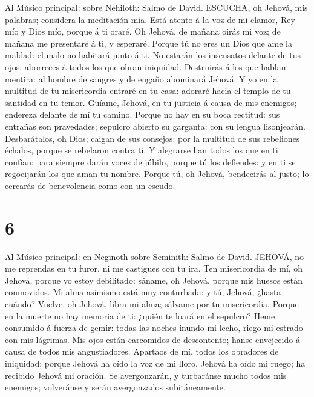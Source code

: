  Al Músico principal: sobre Nehiloth: Salmo de David.
ESCUCHA, oh Jehová, mis palabras; considera la meditación mía.
 Está atento á la voz de mi clamor, Rey mío y Dios mío,
porque á ti oraré.  Oh Jehová, de mañana oirás mi voz; de
mañana me presentaré á ti, y esperaré.  Porque tú no eres un
Dios que ame la maldad: el malo no habitará junto á ti.  No
estarán los insensatos delante de tus ojos: aborreces á todos los que
obran iniquidad.  Destruirás á los que hablan mentira: al
hombre de sangres y de engaño abominará Jehová.  Y yo en la
multitud de tu misericordia entraré en tu casa: adoraré hacia el templo
de tu santidad en tu temor.  Guíame, Jehová, en tu justicia
á causa de mis enemigos; endereza delante de mí tu camino. 
Porque no hay en su boca rectitud: sus entrañas son pravedades; sepulcro
abierto su garganta: con su lengua lisonjearán. 
Desbarátalos, oh Dios; caigan de sus consejos: por la multitud de sus
rebeliones échalos, porque se rebelaron contra ti.  Y
alegrarse han todos los que en ti confían; para siempre darán voces de
júbilo, porque tú los defiendes: y en ti se regocijarán los que aman tu
nombre.  Porque tú, oh Jehová, bendecirás al justo; lo
cercarás de benevolencia como con un escudo.

\hypertarget{section-5}{%
\section{6}\label{section-5}}

 Al Músico principal: en Neginoth sobre Seminith: Salmo de
David. JEHOVÁ, no me reprendas en tu furor, ni me castigues con tu ira.
 Ten misericordia de mí, oh Jehová, porque yo estoy
debilitado: sáname, oh Jehová, porque mis huesos están conmovidos.
 Mi alma asimismo está muy conturbada: y tú, Jehová, ¿hasta
cuándo?  Vuelve, oh Jehová, libra mi alma; sálvame por tu
misericordia.  Porque en la muerte no hay memoria de ti:
¿quién te loará en el sepulcro?  Heme consumido á fuerza de
gemir: todas las noches inundo mi lecho, riego mi estrado con mis
lágrimas.  Mis ojos están carcomidos de descontento; hanse
envejecido á causa de todos mis angustiadores.  Apartaos de
mí, todos los obradores de iniquidad; porque Jehová ha oído la voz de mi
lloro.  Jehová ha oído mi ruego; ha recibido Jehová mi
oración.  Se avergonzarán, y turbaránse mucho todos mis
enemigos; volveránse y serán avergonzados subitáneamente.

